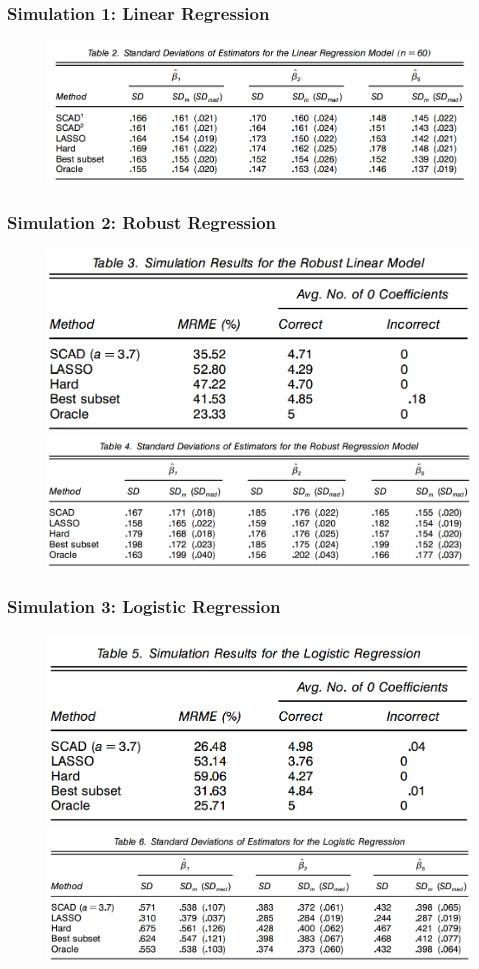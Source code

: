 \documentclass{beamer}
\begin{document}
	\begin{frame}
		\frametitle{Simulation 1: Linear Regression}
		\begin{figure}
			\includegraphics[width=0.9\linewidth]{image020.png}
		\end{figure}
	\end{frame}
	
	\begin{frame}
		\frametitle{Simulation 2: Robust Regression}
		\begin{figure}
			\includegraphics[width=0.6\linewidth]{image021.png}
			\includegraphics[width=0.9\linewidth]{image022.png}
		\end{figure}
	\end{frame}
	
	\begin{frame}
		\frametitle{Simulation 3: Logistic Regression}
		\begin{figure}
			\includegraphics[width=0.6\linewidth]{image023.png}
			\includegraphics[width=0.9\linewidth]{image024.png}
		\end{figure}
	\end{frame}
	
\end{document}
